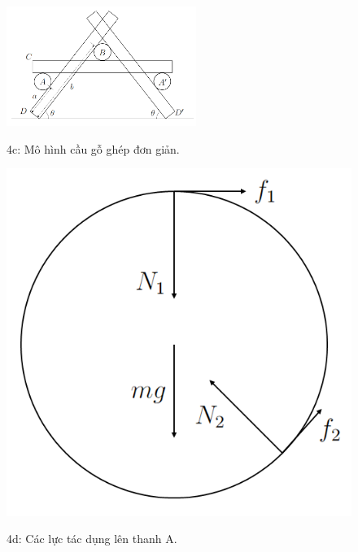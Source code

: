 \begin{figure}
  \centering
  \includegraphics[width=0.55\textwidth]{images/Hinh 4c.PNG}
  \begin{center}
    \figurename{ 4c: Mô hình cầu gỗ ghép đơn giản.}
  \end{center}
\end{figure}

\begin{figure}[h]
  \centering
  \begin{minipage}{5cm}
    \centering
    \includegraphics[width=1.1\textwidth]{images/Hinh 4d.PNG}
    \begin{center}
      \figurename{ 4d: Các lực tác dụng lên thanh A.}
    \end{center}
  \end{minipage}
  \hfil
  \begin{minipage}{5cm}
    \centering

\end{minipage}
\end{figure}
